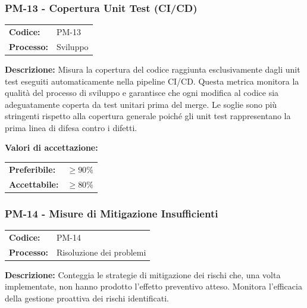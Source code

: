 \documentclass[a4paper,11pt,oneside]{scrartcl}
\begin{document}
\subsubsection{PM-13 - Copertura Unit Test (CI/CD)}

\noindent
\begin{tabular}{@{}p{}p{}@{}}
\textbf{Codice:} & PM-13 \\
\textbf{Processo:} & Sviluppo \\
\end{tabular}

\vspace{0.3cm}
\noindent\textbf{Descrizione:} Misura la copertura del codice raggiunta esclusivamente dagli unit test{\scriptsize{}} eseguiti automaticamente nella pipeline{\scriptsize{}} CI/CD{\scriptsize{}}. Questa metrica monitora la qualità del processo di sviluppo e garantisce che ogni modifica al codice sia adeguatamente coperta da test unitari prima del merge. Le soglie sono più stringenti rispetto alla copertura generale poiché gli unit test rappresentano la prima linea di difesa contro i difetti.

\vspace{0.2cm}
\noindent\textbf{Valori di accettazione:}
\vspace{0.1cm}

\noindent
\begin{tabular}{@{}ll@{}}
\textbf{Preferibile:} & $\ge 90\%$ \\
\textbf{Accettabile:} & $\ge 80\%$ \\
\end{tabular}

\subsubsection{PM-14 - Misure di Mitigazione Insufficienti}

\noindent
\begin{tabular}{@{}p{}p{}@{}}
\textbf{Codice:} & PM-14 \\
\textbf{Processo:} & Risoluzione dei problemi \\
\end{tabular}

\vspace{0.3cm}
\noindent\textbf{Descrizione:} Conteggia le strategie di mitigazione{\scriptsize{}} dei rischi che, una volta implementate, non hanno prodotto l'effetto preventivo atteso. Monitora l'efficacia della gestione proattiva dei rischi identificati.
\end{document}
